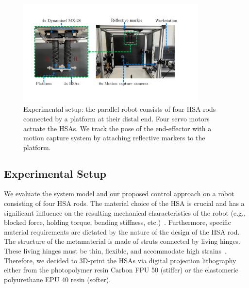 \begin{figure}[t]
    \centering
    \includegraphics[width=0.85\textwidth]{hsacontrol/figures/experimental_setup_v2_cropped_compressed.pdf}
    \caption{Experimental setup: the parallel robot consists of four HSA rods connected by a platform at their distal end. Four servo motors actuate the HSAs. We track the pose of the end-effector with a motion capture system by attaching reflective markers to the platform.}
    \label{fig:hsacontrol:experimental_setup}
\end{figure}

\subsection{Experimental Setup}\label{sub:hsacontrol:configuration_space_regulation:experimental_setup}
We evaluate the system model and our proposed control approach on a robot consisting of four HSA rods.
The material choice of the \gls{HSA} is crucial and has a significant influence on the resulting mechanical characteristics of the robot  (e.g., blocked force, holding torque, bending stiffness, etc.)~\citep{truby2021recipe}. Furthermore, specific material requirements are dictated by the nature of the design of the \gls{HSA} rod. The structure of the metamaterial is made of struts connected by living hinges. These living hinges must be thin, flexible, and accommodate high strains~\citep{truby2021recipe}.
Therefore, we decided to 3D-print the \glspl{HSA} via digital projection lithography either from the photopolymer resin Carbon FPU 50 (stiffer) or the elastomeric polyurethane EPU 40 resin (softer).

